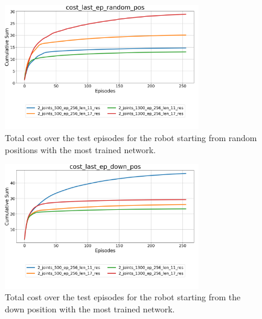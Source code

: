 \documentclass[twocolumn, a4paper]{article}
\begin{document}
\begin{figure}[H]
	\centering
	\includegraphics[width=8.5cm]{"../Figures/Summary_cost_last_ep_random_pos_2J.png"}
	\caption{Total cost over the test episodes for the robot starting
			 from random positions with the most trained network.}
	\label{fig:Test_2_last_ep_random_pos}
\end{figure}

\begin{figure}[H]
	\centering
	\includegraphics[width=8.5cm]{"../Figures/Summary_cost_last_ep_down_pos_2J.png"}
	\caption{Total cost over the test episodes for the robot starting
			 from the down position with the most trained network.}
	\label{fig:Test_2_last_ep_down_pos}
\end{figure}
\end{document}
